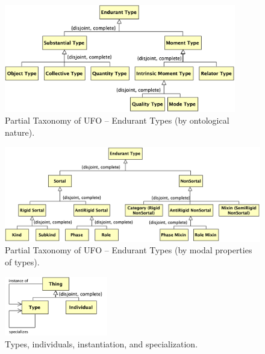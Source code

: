 \documentclass{article}
\newcommand{\BeginEndurantTaxonomyOfNaturesBegin}{146}
\newcommand{\EndEndurantTaxonomyOfNaturesEnd}{190}
\newcommand{\BeginEndurantTaxonomyOfPropertiesBegin}{192}
\newcommand{\EndEndurantTaxonomyOfPropertiesEnd}{268}
\newcommand{\BeginInstantationAndSpecialzation}{270}
\newcommand{\EndInstantationAndSpecialzation}{320}
\begin{document}
\begin{figure}[ht]
    \centering
    \includegraphics[width=0.9\textwidth]{diagrams/Endurant_Type_Natures_Diagram.png}
    \caption{Partial Taxonomy of UFO -- Endurant Types (by ontological nature).}
    \label{fig:ufo_taxonomy_endurant_types_natures}
\end{figure}




\begin{figure}[ht]
    \centering
    \includegraphics[width=\textwidth]{diagrams/Endurant_Type_Properties_Diagram.png}
    \caption{Partial Taxonomy of UFO -- Endurant Types (by modal properties of types).}
    \label{fig:ufo_taxonomy_endurant_types_properties}
\end{figure}




\begin{figure}[ht]
    \centering
    \includegraphics[width=0.4\textwidth]{diagrams/Instantiation_Diagram.png}
    \caption{Types, individuals, instantiation, and specialization.}
    \label{fig:instantiation_and_specialization}
\end{figure}



% 
% 
\end{document}
